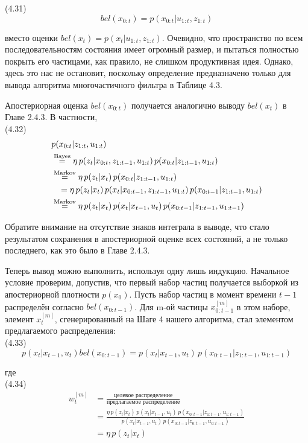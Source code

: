 \documentclass[10pt,a4paper]{article}
\begin{document}
(4.31)
$$bel(x_{0:t})=p(x_{0:t}|u_{1:t},z_{1:t})$$

вместо оценки $bel(x_t) = p(x_t | u_{1:t}, z_{1:t})$. Очевидно, что пространство по всем последовательностям состояния имеет огромный размер, и пытаться полностью покрыть его частицами, как правило, не слишком продуктивная идея. 
Однако, здесь это нас не остановит, поскольку определение предназначено только для вывода алгоритма многочастичного фильтра в Таблице 4.3.

Апостериорная оценка $bel(x_{0:t})$ получается аналогично выводу $bel(x_t)$
в Главе 2.4.3. В частности,\\

(4.32)
\begin{equation*}
\begin{split}
&p(x_{0:t}|z_{1:t},u_{1:t})\\
&\stackrel{\text{Bayes}}{=}\eta\,p(z_t|x_{0:t},z_{1:t-1},u_{1:t})\,p(x_{0:t}|z_{1:t-1},u_{1:t})\\
&\stackrel{\text{Markov}}{=}\eta\,p(z_t|x_t)\,p(x_{0:t}|z_{1:t-1},u_{1:t})\\
&\hspace{3mm}=\eta\,p(z_t|x_t)\,p(x_t|x_{0:t-1},z_{1:t-1},u_{1:t})\,p(x_{0:t-1}|z_{1:t-1},u_{1:t})\\
&\stackrel{\text{Markov}}{=}\eta\,p(z_t|x_t)\,p(x_t|x_{t-1},u_t)\,p(x_{0:t-1}|z_{1:t-1},u_{1:t-1})
\end{split}
\end{equation*}

Обратите внимание на отсутствие знаков интеграла в выводе, что стало результатом сохранения в апостериорной оценке всех состояний, а не только последнего, как это было в Главе 2.4.3.

Теперь вывод можно выполнить, используя одну лишь индукцию. Начальное условие проверим, допустив, что первый набор частиц получается выборкой из апостериорной плотности $p(x_0)$. Пусть набор частиц в момент времени $t - 1$ распределён согласно $bel(x_{0:t-1})$. Для m-ой частицы $x_{0:t-1}^{[m]}$ в этом наборе, элемент $x_t^{[m]}$, сгенерированный на Шаге 4 нашего алгоритма, стал элементом предлагаемого распределения:\\

(4.33)
$$p(x_t|x_{t-1},u_t)bel(x_{0:t-1})=p(x_t|x_{t-1},u_t)\,p(x_{0:t-1}|z_{1:t-1},u_{1:t-1})$$

где\\

(4.34)
\begin{equation*}
\begin{split}
w_t^{[m]}&=\frac{\text{целевое распределение}}{\text{предлагаемое распределение}}\\
&=\frac{\eta\,p(z_t|x_t)\,p(x_t|x_{t-1},u_t)\,p(x_{0:t-1}|z_{1:t-1},u_{1:t-1})}{p(x_t|x_{t-1},u_t)\,p(x_{0:t-1}|z_{0:t-1},u_{0:t-1})}\\
&=\eta\,p(z_t|x_t)
\end{split}
\end{equation*}
\end{document}
